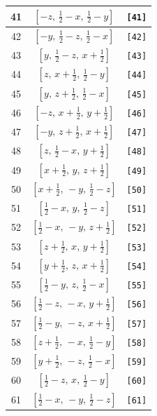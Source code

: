 \documentclass[fleqn,8pt]{jsarticle}
\begin{document}
\begin{longtable}{ccc}
41 & $\left[ - z,\, \frac{1}{2} - x,\, \frac{1}{2} - y \right]$ & {\tt [41]} \\ \hline
42 & $\left[ - y,\, \frac{1}{2} - z,\, \frac{1}{2} - x \right]$ & {\tt [42]} \\ \hline
43 & $\left[ y,\, \frac{1}{2} - z,\, x + \frac{1}{2} \right]$ & {\tt [43]} \\ \hline
44 & $\left[ z,\, x + \frac{1}{2},\, \frac{1}{2} - y \right]$ & {\tt [44]} \\ \hline
45 & $\left[ y,\, z + \frac{1}{2},\, \frac{1}{2} - x \right]$ & {\tt [45]} \\ \hline
46 & $\left[ - z,\, x + \frac{1}{2},\, y + \frac{1}{2} \right]$ & {\tt [46]} \\ \hline
47 & $\left[ - y,\, z + \frac{1}{2},\, x + \frac{1}{2} \right]$ & {\tt [47]} \\ \hline
48 & $\left[ z,\, \frac{1}{2} - x,\, y + \frac{1}{2} \right]$ & {\tt [48]} \\ \hline
49 & $\left[ x + \frac{1}{2},\, y,\, z + \frac{1}{2} \right]$ & {\tt [49]} \\ \hline
50 & $\left[ x + \frac{1}{2},\, - y,\, \frac{1}{2} - z \right]$ & {\tt [50]} \\ \hline
51 & $\left[ \frac{1}{2} - x,\, y,\, \frac{1}{2} - z \right]$ & {\tt [51]} \\ \hline
52 & $\left[ \frac{1}{2} - x,\, - y,\, z + \frac{1}{2} \right]$ & {\tt [52]} \\ \hline
53 & $\left[ z + \frac{1}{2},\, x,\, y + \frac{1}{2} \right]$ & {\tt [53]} \\ \hline
54 & $\left[ y + \frac{1}{2},\, z,\, x + \frac{1}{2} \right]$ & {\tt [54]} \\ \hline
55 & $\left[ \frac{1}{2} - y,\, z,\, \frac{1}{2} - x \right]$ & {\tt [55]} \\ \hline
56 & $\left[ \frac{1}{2} - z,\, - x,\, y + \frac{1}{2} \right]$ & {\tt [56]} \\ \hline
57 & $\left[ \frac{1}{2} - y,\, - z,\, x + \frac{1}{2} \right]$ & {\tt [57]} \\ \hline
58 & $\left[ z + \frac{1}{2},\, - x,\, \frac{1}{2} - y \right]$ & {\tt [58]} \\ \hline
59 & $\left[ y + \frac{1}{2},\, - z,\, \frac{1}{2} - x \right]$ & {\tt [59]} \\ \hline
60 & $\left[ \frac{1}{2} - z,\, x,\, \frac{1}{2} - y \right]$ & {\tt [60]} \\ \hline
61 & $\left[ \frac{1}{2} - x,\, - y,\, \frac{1}{2} - z \right]$ & {\tt [61]} \\ \hline

\end{longtable}
\end{document}
